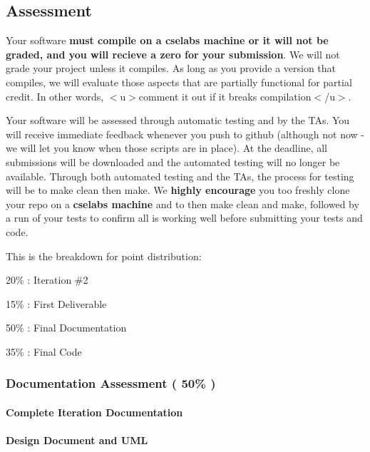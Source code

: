 \subsection*{Assessment}

Your software {\bfseries must compile on a cselabs machine or it will not be graded, and you will recieve a zero for your submission}. We will not grade your project unless it compiles. As long as you provide a version that compiles, we will evaluate those aspects that are partially functional for partial credit. In other words, $<$u$>$comment it out if it breaks compilation$<$/u$>$.

Your software will be assessed through automatic testing and by the T\+As. You will receive immediate feedback whenever you push to github (although not now -\/ we will let you know when those scripts are in place). At the deadline, all submissions will be downloaded and the automated testing will no longer be available. Through both automated testing and the T\+As, the process for testing will be to {\ttfamily make clean} then {\ttfamily make}. We {\bfseries highly encourage} you too freshly clone your repo on a {\bfseries cselabs machine} and to then {\ttfamily make clean} and {\ttfamily make}, followed by a run of your tests to confirm all is working well before submitting your tests and code.

This is the breakdown for point distribution\+:

20\% \+: Iteration \#2
\begin{DoxyItemize}
\item 15\% \+: First Deliverable
\item 50\% \+: Final Documentation
\item 35\% \+: Final Code
\end{DoxyItemize}

\subsubsection*{Documentation Assessment ( 50\% )}

\paragraph*{Complete Iteration Documentation}

\paragraph*{Design Document and U\+ML}

